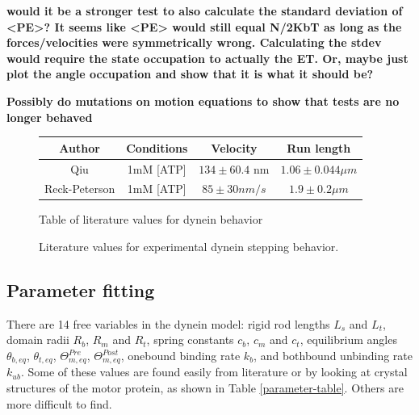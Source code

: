 \documentclass[10pt]{article} %
\begin{document}
\textbf{would it be a stronger test to also calculate the standard deviation of <PE>? It seems like <PE> would still equal N/2KbT as long as the forces/velocities were symmetrically wrong. Calculating the stdev would require the state occupation to actually the ET. Or, maybe just plot the angle occupation and show that it is what it should be?}

\textbf{Possibly do mutations on motion equations to show that tests are no longer behaved}

\begin{figure}[h]
  \centering
  \begin{tabular}{| c | c | c | c |}
    \hline
    Author & Conditions & Velocity & Run length\\\hline
    Qiu \cite{weihongpaper} & 1mM [ATP] & $134 \pm 60.4$ nm & $1.06 \pm 0.044 \mu m$\\ \hline
    Reck-Peterson \cite{reck2006single} & 1mM [ATP] & $85 \pm 30 nm/s$  & $1.9 \pm 0.2 \mu m$\\ \hline
  \end{tabular}
  \caption{Literature values for experimental dynein stepping behavior.}{Table of literature values for dynein behavior}
  \label{table:parameter-table}
\end{figure}




\subsection{Parameter fitting}
There are 14 free variables in the dynein model: rigid rod lengths $L_s$ and $L_t$, domain radii $R_b$, $R_m$ and $R_t$, spring constants $c_b$, $c_m$ and $c_t$, equilibrium angles $\theta_{b,eq}$, $\theta_{t,eq}$, $\Theta_{m,eq}^{Pre}$, $\Theta_{m,eq}^{Post}$, onebound binding rate $k_b$, and bothbound unbinding rate $k_{ub}$. Some of these values are found easily from literature or by looking at crystal structures of the motor protein, as shown in Table \ref{parameter-table}. Others are more difficult to find.\\
\end{document}
